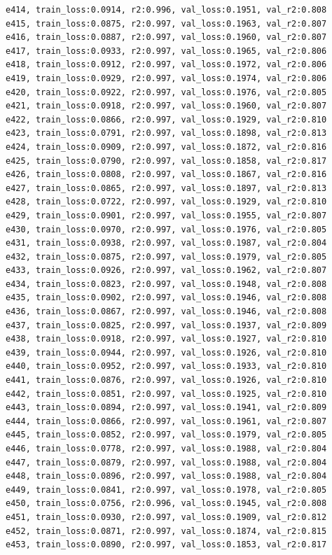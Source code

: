\documentclass[a4paper, 12pt]{article}
\begin{document}
\begin{lstlisting}
e414, train_loss:0.0914, r2:0.996, val_loss:0.1951, val_r2:0.808
e415, train_loss:0.0875, r2:0.997, val_loss:0.1963, val_r2:0.807
e416, train_loss:0.0887, r2:0.997, val_loss:0.1960, val_r2:0.807
e417, train_loss:0.0933, r2:0.997, val_loss:0.1965, val_r2:0.806
e418, train_loss:0.0912, r2:0.997, val_loss:0.1972, val_r2:0.806
e419, train_loss:0.0929, r2:0.997, val_loss:0.1974, val_r2:0.806
e420, train_loss:0.0922, r2:0.997, val_loss:0.1976, val_r2:0.805
e421, train_loss:0.0918, r2:0.997, val_loss:0.1960, val_r2:0.807
e422, train_loss:0.0866, r2:0.997, val_loss:0.1929, val_r2:0.810
e423, train_loss:0.0791, r2:0.997, val_loss:0.1898, val_r2:0.813
e424, train_loss:0.0909, r2:0.997, val_loss:0.1872, val_r2:0.816
e425, train_loss:0.0790, r2:0.997, val_loss:0.1858, val_r2:0.817
e426, train_loss:0.0808, r2:0.997, val_loss:0.1867, val_r2:0.816
e427, train_loss:0.0865, r2:0.997, val_loss:0.1897, val_r2:0.813
e428, train_loss:0.0722, r2:0.997, val_loss:0.1929, val_r2:0.810
e429, train_loss:0.0901, r2:0.997, val_loss:0.1955, val_r2:0.807
e430, train_loss:0.0970, r2:0.997, val_loss:0.1976, val_r2:0.805
e431, train_loss:0.0938, r2:0.997, val_loss:0.1987, val_r2:0.804
e432, train_loss:0.0875, r2:0.997, val_loss:0.1979, val_r2:0.805
e433, train_loss:0.0926, r2:0.997, val_loss:0.1962, val_r2:0.807
e434, train_loss:0.0823, r2:0.997, val_loss:0.1948, val_r2:0.808
e435, train_loss:0.0902, r2:0.997, val_loss:0.1946, val_r2:0.808
e436, train_loss:0.0867, r2:0.997, val_loss:0.1946, val_r2:0.808
e437, train_loss:0.0825, r2:0.997, val_loss:0.1937, val_r2:0.809
e438, train_loss:0.0918, r2:0.997, val_loss:0.1927, val_r2:0.810
e439, train_loss:0.0944, r2:0.997, val_loss:0.1926, val_r2:0.810
e440, train_loss:0.0952, r2:0.997, val_loss:0.1933, val_r2:0.810
e441, train_loss:0.0876, r2:0.997, val_loss:0.1926, val_r2:0.810
e442, train_loss:0.0851, r2:0.997, val_loss:0.1925, val_r2:0.810
e443, train_loss:0.0894, r2:0.997, val_loss:0.1941, val_r2:0.809
e444, train_loss:0.0866, r2:0.997, val_loss:0.1961, val_r2:0.807
e445, train_loss:0.0852, r2:0.997, val_loss:0.1979, val_r2:0.805
e446, train_loss:0.0778, r2:0.997, val_loss:0.1988, val_r2:0.804
e447, train_loss:0.0879, r2:0.997, val_loss:0.1988, val_r2:0.804
e448, train_loss:0.0896, r2:0.997, val_loss:0.1988, val_r2:0.804
e449, train_loss:0.0841, r2:0.997, val_loss:0.1978, val_r2:0.805
e450, train_loss:0.0756, r2:0.996, val_loss:0.1945, val_r2:0.808
e451, train_loss:0.0930, r2:0.997, val_loss:0.1909, val_r2:0.812
e452, train_loss:0.0871, r2:0.997, val_loss:0.1874, val_r2:0.815
e453, train_loss:0.0890, r2:0.997, val_loss:0.1853, val_r2:0.817

\end{lstlisting}
\end{document}
